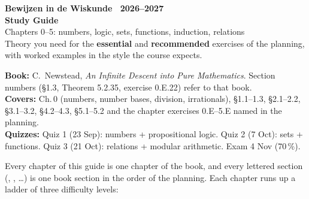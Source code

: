 \thispagestyle{empty}
\begin{tcolorbox}[enhanced, colback=hblue, colframe=hblue, boxrule=0pt, arc=4pt, left=16pt, right=16pt, top=22pt, bottom=22pt]
  \color{white}\sffamily
  {\large\bfseries Bewijzen in de Wiskunde \textperiodcentered\ 2026--2027}\\[10pt]
  {\fontsize{34}{38}\selectfont\bfseries Study Guide}\\[6pt]
  {\fontsize{22}{26}\selectfont Chapters 0--5: numbers, logic, sets, functions, induction, relations}\\[14pt]
  {\normalsize Theory you need for the \textbf{essential} and \textbf{recommended} exercises of the planning,\\
   with worked examples in the style the course expects.}
\end{tcolorbox}

\vspace{10pt}
\begin{tcolorbox}[enhanced, colback=white, colframe=hblue2, boxrule=0.8pt, arc=2pt, left=10pt, right=10pt, top=8pt, bottom=8pt]
\sffamily\small
\textbf{\textcolor{hblue}{Book:}} C.~Newstead, \emph{An Infinite Descent into Pure Mathematics}. Section numbers (\eg \S1.3, Theorem 5.2.35, exercise 0.E.22) refer to that book.\\[3pt]
\textbf{\textcolor{hblue}{Covers:}} Ch.\,0 (numbers, number bases, division, irrationals), \S1.1--1.3, \S2.1--2.2, \S3.1--3.2, \S4.2--4.3, \S5.1--5.2 and the chapter exercises 0.E--5.E named in the planning.\\[3pt]
\textbf{\textcolor{hblue}{Quizzes:}} Quiz 1 (23 Sep): numbers + propositional logic. Quiz 2 (7 Oct): sets + functions. Quiz 3 (21 Oct): relations + modular arithmetic. Exam 4 Nov (70\,\%).
\end{tcolorbox}

\vspace{8pt}
Every chapter of this guide is one chapter of the book, and every lettered section (, , \dots) is one book section in the order of the planning. Each chapter runs up a ladder of three difficulty levels:

